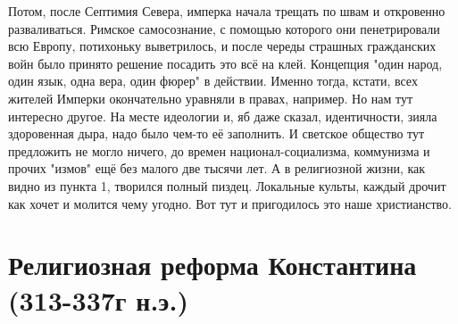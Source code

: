 Потом, после Септимия Севера, имперка начала трещать по швам и откровенно разваливаться. Римское самосознание, с помощью которого они пенетрировали всю Европу, потихоньку выветрилось, и после череды страшных гражданских войн было принято решение посадить это всё на клей. Концепция "один народ, один язык, одна вера, один фюрер" в действии. Именно тогда, кстати, всех жителей Имперки окончательно уравняли в правах, например. Но нам тут интересно другое. На месте идеологии и, яб даже сказал, идентичности, зияла здоровенная дыра, надо было чем-то её заполнить. И светское общество тут предложить не могло ничего, до времен национал-социализма, коммунизма и прочих "измов" ещё без малого две тысячи лет. А в религиозной жизни, как видно из пункта 1, творился полный пиздец. Локальные культы, каждый дрочит как хочет и молится чему угодно. Вот тут и пригодилось это наше христианство.

\section{ Религиозная реформа Константина (313-337г н.э.)}

